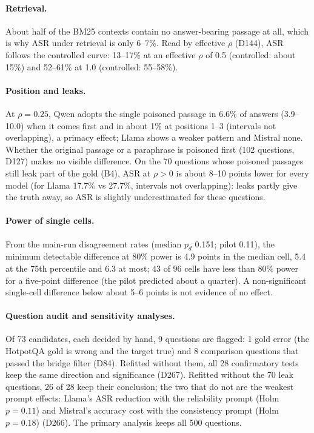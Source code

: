 \documentclass[11pt,a4paper]{report}
\begin{document}
\paragraph{Retrieval.} About half of the BM25 contexts contain no answer-bearing passage at all, which is
why ASR under retrieval is only 6--7\%. Read by effective $\rho$ (D144), ASR follows the controlled curve:
13--17\% at an effective $\rho$ of 0.5 (controlled: about 15\%) and 52--61\% at 1.0 (controlled: 55--58\%).

\paragraph{Position and leaks.} At $\rho=0.25$, Qwen adopts the single poisoned passage in 6.6\% of answers
(3.9--10.0) when it comes first and in about 1\% at positions 1--3 (intervals not overlapping), a primacy
effect; Llama shows a weaker pattern and Mistral none. Whether the original passage or a paraphrase is
poisoned first (102 questions, D127) makes no visible difference. On the 70 questions whose poisoned
passages still leak part of the gold (B4), ASR at $\rho>0$ is about 8--10 points lower for every model (for
Llama 17.7\% vs 27.7\%, intervals not overlapping): leaks partly give the truth away, so ASR is slightly
underestimated for these questions.

\paragraph{Power of single cells.} From the main-run disagreement rates (median $p_d$ 0.151; pilot 0.11), the
minimum detectable difference at 80\% power is 4.9 points in the median cell, 5.4 at the 75th percentile and
6.3 at most; 43 of 96 cells have less than 80\% power for a five-point difference (the pilot predicted about a
quarter). A non-significant single-cell difference below about 5--6 points is not evidence of no effect.

\paragraph{Question audit and sensitivity analyses.} Of 73 candidates, each decided by hand, 9 questions are
flagged: 1 gold error (the HotpotQA gold is wrong and the target true) and 8 comparison questions that
passed the bridge filter (D84). Refitted without them, all 28 confirmatory tests keep the same direction and
significance (D267). Refitted without the 70 leak questions, 26 of 28 keep their conclusion; the two that do
not are the weakest prompt effects: Llama's ASR reduction with the reliability prompt (Holm $p=0.11$) and
Mistral's accuracy cost with the consistency prompt (Holm $p=0.18$) (D266). The primary analysis keeps all
500 questions.
\end{document}
